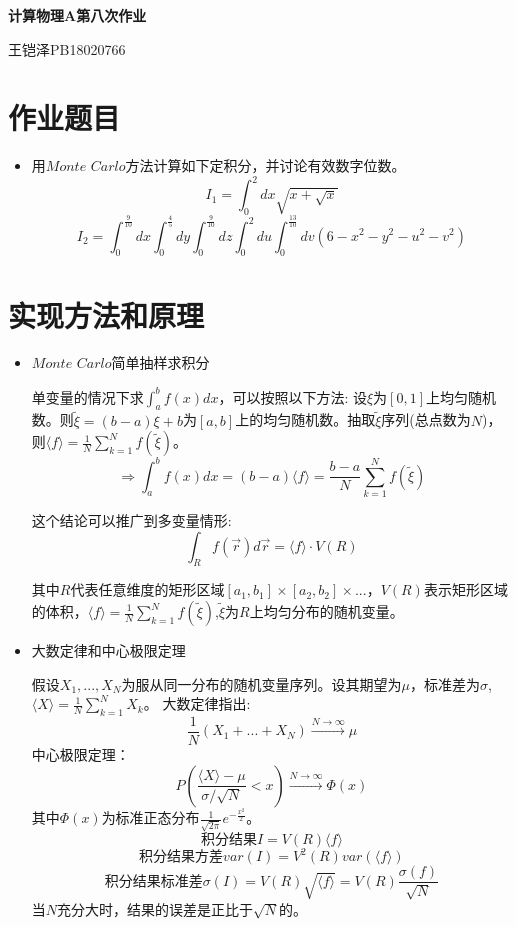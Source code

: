 \documentclass[UTF8]{ctexart}
\begin{document}
	\centering\textbf{\LARGE{计算物理A第八次作业}}
	
	
	王铠泽\qquad PB18020766
	
		
	\section{作业题目}
	
	\begin{itemize}
		\item 用$Monte\,\,Carlo$方法计算如下定积分，并讨论有效数字位数。
		\subitem $$I_1=\int_{0}^{2}dx\sqrt{x+\sqrt{x}}$$
		\subitem $$I_2=\int _{0}^{\frac{9}{10}}dx\int_{0}^{\frac{4}{5}}dy\int_{0}^{\frac{9}{10}}dz\int_{0}^{2}du\int_{0}^{\frac{13}{10}}dv(6-x^2-y^2-u^2-v^2) $$
	\end{itemize}
	
	\section{实现方法和原理}
	
	\begin{itemize}
		\item $Monte\,\,Carlo$简单抽样求积分
		
		单变量的情况下求$\int_{a}^{b}f(x)dx$，可以按照以下方法:
		设$\xi$为$[0,1]$上均匀随机数。则$\tilde{\xi}=(b-a)\xi+b$为$[a,b]$上的均匀随机数。抽取$\tilde{\xi}$序列(总点数为$N$)，则$\langle f\rangle=\frac{1}{N}\sum_{k=1}^{N}f(\tilde{\xi})$。
		$$\Rightarrow \int_{a}^{b}f(x)dx=(b-a)\langle f\rangle=\frac{b-a}{N}\sum_{k=1}^{N}f(\tilde{\xi})$$
		
		这个结论可以推广到多变量情形:
		$$\int_{R}f(\vec{r})d\vec{r}=\langle f\rangle\cdot V(R)$$
		\begin{flushleft}
			其中$R$代表任意维度的矩形区域$[a_1,b_1]\times[a_2,b_2]\times...$，$V(R)$表示矩形区域的体积，$\langle f\rangle=\frac{1}{N}\sum_{k=1}^{N}f(\tilde{\xi})$,$\tilde{\xi}$为$R$上均匀分布的随机变量。
		\end{flushleft}
		
		\item 大数定律和中心极限定理
	
		假设$X_1,...,X_N$为服从同一分布的随机变量序列。设其期望为$\mu$，标准差为$\sigma$,$ \langle X \rangle=\frac{1}{N}\sum_{k=1}^{N}X_k$。
		大数定律指出:
		$$\frac{1}{N}(X_1+...+X_N)\stackrel{N\rightarrow\infty}{\longrightarrow}\mu$$
		中心极限定理：
		$$P(\frac{\langle X \rangle-\mu}{\sigma/\sqrt{N}}<x)\stackrel{N\rightarrow\infty}{\longrightarrow}\Phi(x)$$
		其中$\Phi(x)$为标准正态分布$\frac{1}{\sqrt{2\pi}}e^{-\frac{x^2}{2}}$。
		$$\mbox{积分结果}I=V(R)\langle f \rangle$$
		$$\mbox{积分结果方差}var(I)=V^2(R)var(\langle f \rangle)$$
		$$\mbox{积分结果标准差}\sigma(I)=V(R)\sqrt{\langle f \rangle}=V(R)\frac{\sigma(f)}{\sqrt{N}}$$
		当$N$充分大时，结果的误差是正比于$\sqrt{N}$的。
	\end{itemize}
	
\end{document}
